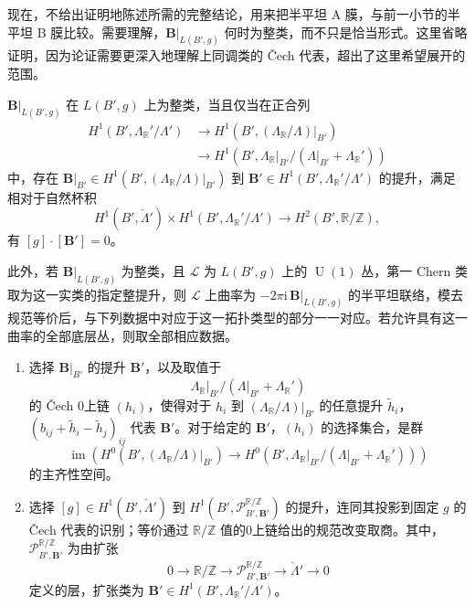 现在，不给出证明地陈述所需的完整结论，用来把半平坦 A 膜，与前一小节的半平坦 B 膜比较。需要理解，$\mathbf B|_{L(B',g)}$ 何时为整类，而不只是恰当形式。这里省略证明，因为论证需要更深入地理解上同调类的 Čech 代表，超出了这里希望展开的范围。

\begin{theorem}\label{thm:6.72}
$\mathbf B|_{L(B',g)}$ 在 $L(B',g)$ 上为整类，当且仅当在正合列
\[
\begin{aligned}
H^1(B',\Lambda_{\mathbb R}'/\Lambda')
&\longrightarrow H^1(B',(\Lambda_{\mathbb R}/\Lambda)|_{B'})\\
&\longrightarrow H^1(B',\Lambda_{\mathbb R}|_{B'}/(\Lambda|_{B'}+\Lambda_{\mathbb R}'))
\end{aligned}
\]
中，存在 $\mathbf B|_{B'}\in H^1(B',(\Lambda_{\mathbb R}/\Lambda)|_{B'})$ 到 $\mathbf B'\in H^1(B',\Lambda_{\mathbb R}'/\Lambda')$ 的提升，满足相对于自然杯积
\[
H^1(B',\check\Lambda')\times H^1(B',\Lambda_{\mathbb R}'/\Lambda')
\longrightarrow H^2(B',\mathbb R/\mathbb Z),
\]
有 $[g]\cdot[\mathbf B']=0$。

此外，若 $\mathbf B|_{L(B',g)}$ 为整类，且 $\mathcal L$ 为 $L(B',g)$ 上的 $\operatorname{U}(1)$ 丛，第一 Chern 类取为这一实类的指定整提升，则 $\mathcal L$ 上曲率为 $-2\pi\mathrm i\,\mathbf B|_{L(B',g)}$ 的半平坦联络，模去规范等价后，与下列数据中对应于这一拓扑类型的部分一一对应。若允许具有这一曲率的全部底层丛，则取全部相应数据。
\begin{enumerate}[label=(\arabic*)]
\item 选择 $\mathbf B|_{B'}$ 的提升 $\mathbf B'$，以及取值于
\[
\Lambda_{\mathbb R}|_{B'}/(\Lambda|_{B'}+\Lambda_{\mathbb R}')
\]
的 Čech 0上链 $(h_i)$，使得对于 $h_i$ 到 $(\Lambda_{\mathbb R}/\Lambda)|_{B'}$ 的任意提升 $\widetilde h_i$，$(b_{ij}+\widetilde h_i-\widetilde h_j)_{ij}$ 代表 $\mathbf B'$。对于给定的 $\mathbf B'$，$(h_i)$ 的选择集合，是群
\[
\operatorname{im}\!\left(H^0(B',(\Lambda_{\mathbb R}/\Lambda)|_{B'})
\longrightarrow H^0(B',\Lambda_{\mathbb R}|_{B'}/(\Lambda|_{B'}+\Lambda_{\mathbb R}'))\right)
\]
的主齐性空间。
\item 选择 $[g]\in H^1(B',\check\Lambda')$ 到 $H^1(B',\mathcal P^{\mathbb R/\mathbb Z}_{B',\mathbf B'})$ 的提升，连同其投影到固定 $g$ 的 Čech 代表的识别；等价通过 $\mathbb R/\mathbb Z$ 值的0上链给出的规范改变取商。其中，$\mathcal P^{\mathbb R/\mathbb Z}_{B',\mathbf B'}$ 为由扩张
\[
0\longrightarrow\mathbb R/\mathbb Z
\longrightarrow\mathcal P^{\mathbb R/\mathbb Z}_{B',\mathbf B'}
\longrightarrow\check\Lambda'\longrightarrow0
\]
定义的层，扩张类为 $\mathbf B'\in H^1(B',\Lambda_{\mathbb R}'/\Lambda')$。
\end{enumerate}
\end{theorem}


